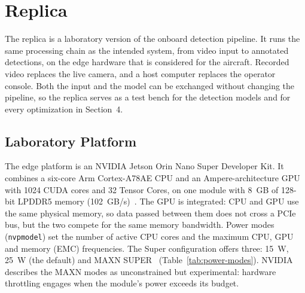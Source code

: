 
\section{Replica}
\vspace{0.35em}

The replica is a laboratory version of the onboard detection pipeline. It runs
the same processing chain as the intended system, from video input to annotated
detections, on the edge hardware that is considered for the aircraft. Recorded
video replaces the live camera, and a host computer replaces the operator
console. Both the input and the model can be exchanged without changing the
pipeline, so the replica serves as a test bench for the detection models and
for every optimization in Section~4.

\subsection{Laboratory Platform}

The edge platform is an NVIDIA Jetson Orin Nano Super Developer Kit. It
combines a six-core Arm Cortex-A78AE CPU and an Ampere-architecture GPU with
1024 CUDA cores and 32 Tensor Cores, on one module with 8~GB of 128-bit LPDDR5
memory (102~GB/s)~\cite{nvidia-orin-nano-super}. The GPU is integrated: CPU
and GPU use the same physical memory, so data passed between them does not
cross a PCIe bus, but the two compete for the same memory bandwidth.
Power modes (\texttt{nvpmodel}) set the number of active CPU cores and the
maximum CPU, GPU and memory (EMC) frequencies. The Super configuration offers
three: 15~W, 25~W (the default) and MAXN SUPER~\cite{nvidia-jetson-power}
(Table~\ref{tab:power-modes}). NVIDIA describes the MAXN modes as
unconstrained but experimental: hardware throttling engages when the module's
power exceeds its budget.

